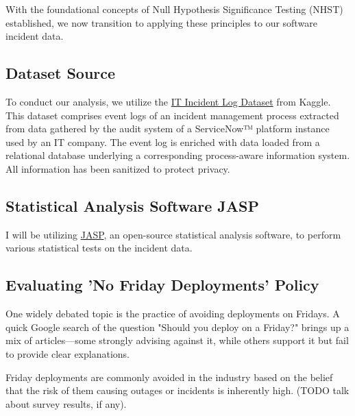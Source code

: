 \documentclass{article}
\begin{document}
With the foundational concepts of Null Hypothesis Significance Testing (NHST) established, we now transition to applying these principles to our software incident data.

\subsection{Dataset Source}

To conduct our analysis, we utilize the \href{https://www.kaggle.com/datasets/shamiulislamshifat/it-incident-log-dataset?resource=download}{IT Incident Log Dataset} from Kaggle. This dataset comprises event logs of an incident management process extracted from data gathered by the audit system of a ServiceNow™ platform instance used by an IT company. The event log is enriched with data loaded from a relational database underlying a corresponding process-aware information system. All information has been sanitized to protect privacy.

\subsection{Statistical Analysis Software JASP}

I will be utilizing \href{https://jasp-stats.org/}{JASP}, an open-source statistical analysis software, to perform various statistical tests on the incident data.

\subsection{Evaluating 'No Friday Deployments' Policy}

One widely debated topic is the practice of avoiding deployments on Fridays. A quick Google search of the question "Should you deploy on a Friday?" brings up a mix of articles—some strongly advising against it, while others support it but fail to provide clear explanations. 

Friday deployments are commonly avoided in the industry based on the belief that the risk of them causing outages or incidents is inherently high. (TODO talk about survey results, if any). 
\end{document}

